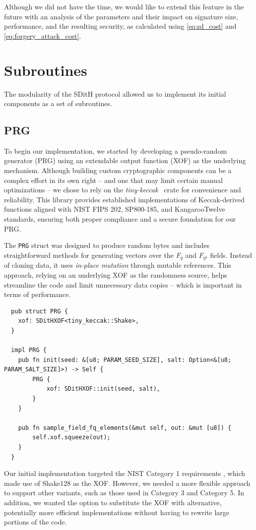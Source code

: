 \documentclass[11pt]{report}
\theoremstyle{definition}
\theoremstyle{plain}
\begin{document}
Although we did not have the time, we would like to extend this feature in the future with an analysis of the parameters and their impact on signature size, performance, and the resulting security, as calculated using \autoref{eq:sd_cost} and \autoref{eq:forgery_attack_cost}.

\section{Subroutines}\label{sub:subroutines}
The modularity of the SDitH protocol allowed us to implement its initial components as a set of subroutines.

\subsection{PRG}\label{sub:prg}
To begin our implementation, we started by developing a pseudo-random generator (PRG) using an extendable output function (XOF) as the underlying mechanism. Although building custom cryptographic components can be a complex effort in its own right -- and one that may limit certain manual optimizations -- we chose to rely on the \textit{tiny-keccak}~\cite{tinykeccak} crate for convenience and reliability. This library provides established implementations of Keccak-derived functions aligned with NIST FIPS 202, SP800-185, and KangarooTwelve standards, ensuring both proper compliance and a secure foundation for our PRG.

The \texttt{PRG} struct was designed to produce random bytes and includes straightforward methods for generating vectors over the $F_q$ and $F_{q^4}$ fields. Instead of cloning data, it uses \textit{in-place mutation} through mutable references. This approach, relying on an underlying XOF as the randomness source, helps streamline the code and limit unnecessary data copies -- which is important in terms of performance.

\begin{verbatim}
  pub struct PRG {
    xof: SDitHXOF<tiny_keccak::Shake>,
  }

  impl PRG {
    pub fn init(seed: &[u8; PARAM_SEED_SIZE], salt: Option<&[u8; PARAM_SALT_SIZE]>) -> Self {
        PRG {
            xof: SDitHXOF::init(seed, salt),
        }
    }

    pub fn sample_field_fq_elements(&mut self, out: &mut [u8]) {
        self.xof.squeeze(out);
    }
  }
\end{verbatim}

Our initial implementation targeted the NIST Category 1 requirements \cite{aguilarsyndrome11}, which made use of Shake128 \cite{aguilarsyndrome11} as the XOF. However, we needed a more flexible approach to support other variants, such as those used in Category 3 and Category 5. In addition, we wanted the option to substitute the XOF with alternative, potentially more efficient implementations without having to rewrite large portions of the code.
\end{document}
